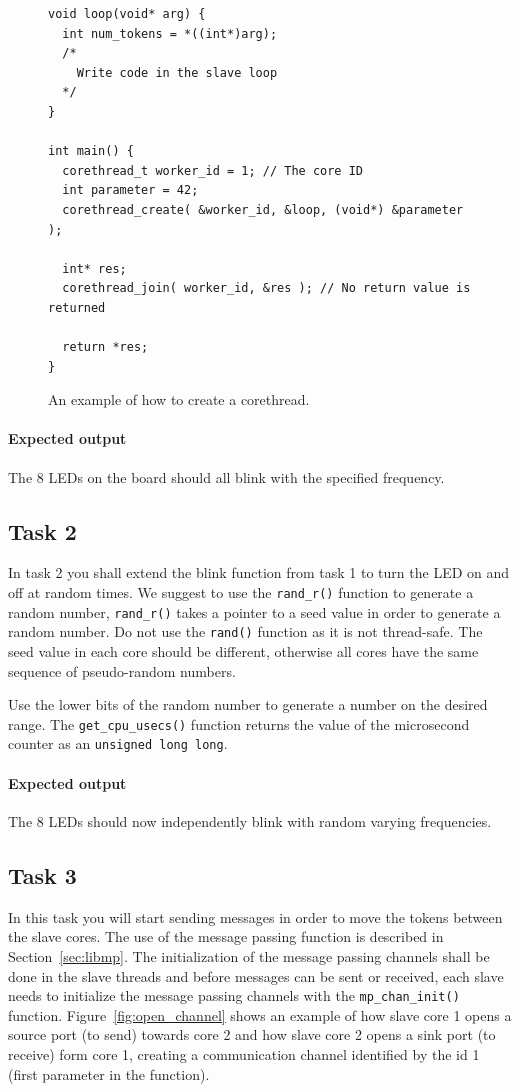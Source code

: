 \documentclass[a4paper,fontsize=10pt,twoside,DIV15,BCOR12mm,headinclude=true,footinclude=false,pagesize,bibtotoc]{scrbook}
\newcommand{\code}[1]{{\texttt{#1}}}
\begin{document}
\begin{figure}
\begin{Verbatim}[xleftmargin=1cm,xrightmargin=1cm,frame=single,framesep=3mm]
void loop(void* arg) {
  int num_tokens = *((int*)arg);
  /*
    Write code in the slave loop
  */
}

int main() {
  corethread_t worker_id = 1; // The core ID
  int parameter = 42;
  corethread_create( &worker_id, &loop, (void*) &parameter );  

  int* res;
  corethread_join( worker_id, &res ); // No return value is returned

  return *res;  
}
\end{Verbatim}
\caption{\label{fig:corethread}An example of how to create a corethread.}
\end{figure}

\paragraph*{Expected output}
The 8 LEDs on the board should all blink with the specified frequency.

\subsection{Task 2}
In task 2 you shall extend the blink function from task 1 to turn the LED on and off at random times.
We suggest to use the \code{rand\_r()} function to generate a random number,
\code{rand\_r()} takes a pointer to a seed value in order to generate a random number.
Do not use the \code{rand()} function as it is not thread-safe.
The seed value in each core should be different, otherwise all cores have the
same sequence of pseudo-random numbers.

Use the lower bits of the random number to generate a number on the desired range.
The \code{get\_cpu\_usecs()} function returns the value of the microsecond counter as an \code{unsigned long long}. 

\paragraph*{Expected output}
The 8 LEDs should now independently blink with random varying frequencies.

\subsection{Task 3}
In this task you will start sending messages in order to move the tokens between the slave cores.
The use of the message passing function is described in Section~\ref{sec:libmp}.
The initialization of the message passing channels shall be done in the slave threads and before messages can be sent or received, each slave needs to initialize the message passing channels with the \code{mp\_chan\_init()} function.
Figure~\ref{fig:open_channel} shows an example of how slave core 1 opens a source port (to send) towards core 2 and how slave core 2 opens a sink port (to receive) form core 1, creating a communication channel identified by the id 1 (first parameter in the function).
\end{document}
